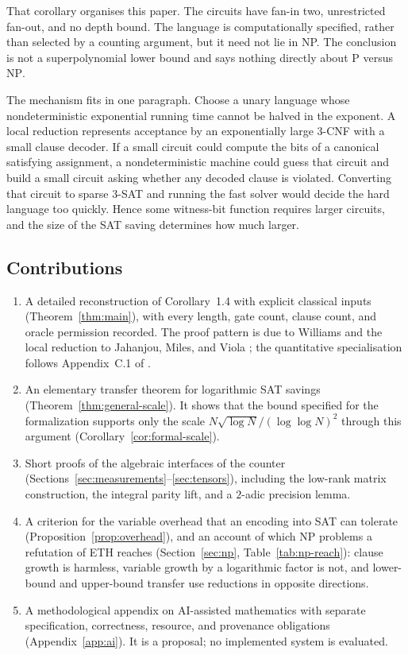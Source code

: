 \documentclass[11pt,reqno]{amsart}
\numberwithin{equation}{section}
\theoremstyle{plain}
\theoremstyle{definition}
\theoremstyle{remark}
\begin{document}
That corollary organises this paper. The circuits have fan-in two,
unrestricted fan-out, and no depth bound. The language is computationally
specified, rather than selected by a counting argument, but it need not lie
in NP. The conclusion is not a superpolynomial lower bound and says nothing
directly about $\mathrm P$ versus $\mathrm{NP}$.

The mechanism fits in one paragraph. Choose a unary language whose
nondeterministic exponential running time cannot be halved in the exponent.
A local reduction represents acceptance by an exponentially large 3-CNF
with a small clause decoder. If a small circuit could compute the bits of a
canonical satisfying assignment, a nondeterministic machine could guess that
circuit and build a small circuit asking whether any decoded clause is
violated. Converting that circuit to sparse 3-SAT and running the fast
solver would decide the hard language too quickly. Hence some witness-bit
function requires larger circuits, and the size of the SAT saving determines
how much larger.

\subsection{Contributions}
\begin{enumerate}[label=(\alph*)]
\item A detailed reconstruction of Corollary~1.4 with explicit classical inputs
 (Theorem~\ref{thm:main}), with every length, gate count, clause count, and
 oracle permission recorded. The proof pattern is due to Williams
 \cite{Williams} and the local reduction to Jahanjou, Miles, and Viola
 \cite{JMV}; the quantitative specialisation follows Appendix~C.1 of
 \cite{OpenAIPaper}.
\item An elementary transfer theorem for logarithmic SAT savings
 (Theorem~\ref{thm:general-scale}). It shows that the bound specified for the
 formalization supports only the scale $N\sqrt{\log N}/(\log\log N)^2$
 through this argument (Corollary~\ref{cor:formal-scale}).
\item Short proofs of the algebraic interfaces of the counter
 (Sections~\ref{sec:measurements}--\ref{sec:tensors}), including the
 low-rank matrix construction, the integral parity lift, and a $2$-adic
 precision lemma.
\item A criterion for the variable overhead that an encoding into SAT can
 tolerate (Proposition~\ref{prop:overhead}), and an account of which NP
 problems a refutation of ETH reaches (Section~\ref{sec:np},
 Table~\ref{tab:np-reach}): clause growth is harmless, variable growth by a
 logarithmic factor is not, and lower-bound and upper-bound transfer use
 reductions in opposite directions.
\item A methodological appendix on AI-assisted mathematics with separate
 specification, correctness, resource, and provenance obligations
 (Appendix~\ref{app:ai}). It is a proposal; no implemented system is evaluated.
\end{enumerate}
\end{document}
